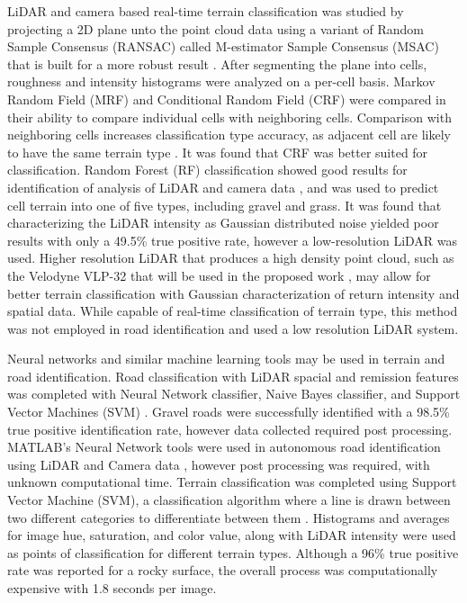 \documentclass[numbered,pdftex]{ohio-etd}
\begin{document}
{{		{LiDAR and camera based real-time terrain classification was studied by projecting a 2D plane unto the point cloud data using a variant of Random Sample Consensus (RANSAC) called M-estimator Sample Consensus (MSAC) \cite{mijakovska_generating_2014} that is built for a more robust result \cite{laible_3d_2012,laible_map_building,laible_terrain_2013}. After segmenting the plane into cells, roughness and intensity histograms were analyzed on a per-cell basis. Markov Random Field (MRF) \cite{chellappa_classification_1985} and Conditional Random Field (CRF) \cite{wallach_conditional_nodate} were compared in their ability to compare individual cells with neighboring cells. Comparison with neighboring cells increases classification type accuracy, as adjacent cell are likely to have the same terrain type \cite{haselich_terrain_2011,zhao_fusion_2014}. It was found that CRF was better suited for classification. Random Forest (RF) classification showed good results for identification of analysis of LiDAR and camera data \cite{breiman_random_2001}, and was used to predict cell terrain into one of five types, including gravel and grass. It was found that characterizing the LiDAR intensity as Gaussian distributed noise yielded poor results with only a 49.5\% true positive rate, however a low-resolution LiDAR was used. Higher resolution LiDAR that produces a high density point cloud, such as the Velodyne VLP-32 that will be used in the proposed work \cite{vlp_32c}, may allow for better terrain classification with Gaussian characterization of return intensity and spatial data. While capable of real-time classification of terrain type, this method was not employed in road identification and used a low resolution LiDAR system.}
		
		{Neural networks and similar machine learning tools may be used in terrain and road identification. Road classification with LiDAR spacial and remission features was completed with Neural Network classifier, Naive Bayes classifier, and Support Vector Machines (SVM) \cite{wang_road_nodate,wang_two-stage_2018}. Gravel roads were successfully identified with a 98.5\% true positive identification rate, however data collected required post processing. MATLAB's Neural Network tools were used in autonomous road identification using LiDAR and Camera data \cite{rasmussen_combining_2002}, however post processing was required, with unknown computational time.  Terrain classification was completed using Support Vector Machine (SVM), a classification algorithm where a line is drawn between two different categories to differentiate between them \cite{breiman_random_2001}. Histograms and averages for image hue, saturation, and color value, along with LiDAR intensity were used as points of classification for different terrain types. Although a 96\% true positive rate was reported for a rocky surface, the overall process was computationally expensive with 1.8 seconds per image. }
		
}}
\end{document}
